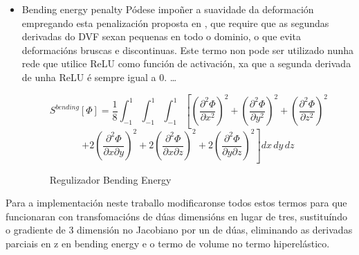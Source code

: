 \begin{itemize}
    \item Bending energy penalty
    Pódese impoñer a suavidade da deformación empregando esta penalización proposta en \cite{bendingenergy}, que 
    require que as segundas derivadas do DVF sexan pequenas en todo o dominio, o que evita deformacións bruscas e discontinuas.
    Este termo non pode ser utilizado nunha rede que utilice ReLU como función de activación, xa que a segunda derivada de unha ReLU é sempre igual a 0.
    \dots
    
    \begin{figure}[ht!]
        \centering
        \[
        S^{bending}[\Phi] = \frac{1}{8} \int_{-1}^{1} \int_{-1}^{1} \int_{-1}^{1} \left[ \left( \frac{\partial^2 \Phi}{\partial x^2} \right)^2 + \left( \frac{\partial^2 \Phi}{\partial y^2} \right)^2 + \left( \frac{\partial^2 \Phi}{\partial z^2} \right)^2 \right.
        \]
        \[
        \left. + 2 \left( \frac{\partial^2 \Phi}{\partial x \partial y} \right)^2 + 2 \left( \frac{\partial^2 \Phi}{\partial x \partial z} \right)^2 + 2 \left( \frac{\partial^2 \Phi}{\partial y \partial z} \right)^2 \right] dx\,dy\,dz
        \]
        \caption{Regulizador Bending Energy}
    \end{figure}
    
\end{itemize}

Para a implementación neste traballo modificaronse todos estos termos para que funcionaran con transfomacións de dúas dimensións en lugar de tres,
 sustituíndo o gradiente de 3 dimensión no Jacobiano por un de dúas, eliminando as derivadas parciais en z en bending energy e o termo de volume no termo hiperelástico.

